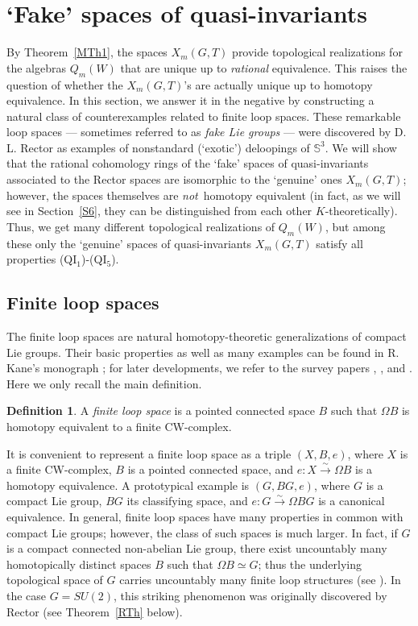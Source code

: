\documentclass[11pt]{amsart}
\theoremstyle{definition}
\newtheorem{defi}[theorem]{Definition}
\theoremstyle{remark}
\numberwithin{equation}{section}
\newcommand{\la}{\label}
\def\bS{\mathbb S}
\begin{document}
\section{`Fake' spaces of quasi-invariants}
\la{S5}
By Theorem~\ref{MTh1}, the spaces $ X_m(G, T) $ provide topological realizations for the algebras
$Q_m(W) $ that are unique up to {\it rational} equivalence. This raises the question of whether the $ X_m(G, T)$'s are actually unique up to homotopy equivalence. In this section, we answer it in the negative by constructing a natural class of counterexamples related to finite loop spaces. These remarkable loop spaces --- sometimes referred to as {\it fake Lie groups} --- were discovered by D. L. Rector \cite{Rec71}  as examples of nonstandard (`exotic') deloopings of $ \bS^3 $. We will show that the rational cohomology rings of the `fake' spaces of quasi-invariants associated to the Rector spaces are isomorphic to the `genuine' ones $X_m(G,T)$; however, the spaces themselves are {\it not}\, homotopy equivalent (in fact, as we will see in Section~\ref{S6}, they can be distinguished from each other $K$-theoretically). 
Thus, we get many different topological realizations of $ Q_m(W) $, but among these only the `genuine' spaces of quasi-invariants $X_m(G,T)$ satisfy all properties (QI$_{1}$)-(QI$_{5}$).

\subsection{Finite loop spaces}
The finite loop spaces are natural homotopy-theoretic generalizations of compact Lie groups. Their basic properties as well as many examples can be found in R. Kane's monograph \cite{K88}; for later developments, we refer to the survey papers \cite{Not95}, \cite{D98}, and \cite{Gr10}. Here we only recall the main definition.
%
\begin{defi}%
\la{FLS}
A {\it finite loop space} is a pointed connected space $B$ such that $ \Omega B $ is homotopy equivalent to a finite CW-complex. 
\end{defi}
%

It is convenient to represent a finite loop space as a triple $(X, B, e)$, where $X$ is a finite CW-complex, $ B $ is a pointed connected space, and $ e: X \stackrel{\sim}{\to} \Omega B $ is a homotopy equivalence. A prototypical example is $(G, BG, e) $, where $G$ is a compact Lie group, $BG$ its classifying space, and $ e: G \stackrel{\sim}{\to} \Omega BG $ is a canonical  equivalence. In general, finite loop spaces have many properties in common with compact Lie groups; however, the class of such spaces is much larger. In fact, if $G$ is a compact connected non-abelian Lie group, there exist uncountably many homotopically distinct spaces $B$ such that $ \Omega B \simeq G $; thus the underlying topological space of $G$ carries uncountably many finite loop structures  (see \cite{Mol92}). In the case $G = SU(2)$, this striking phenomenon was originally discovered by Rector \cite{Rec71} (see Theorem~\ref{RTh} below).
\end{document}

